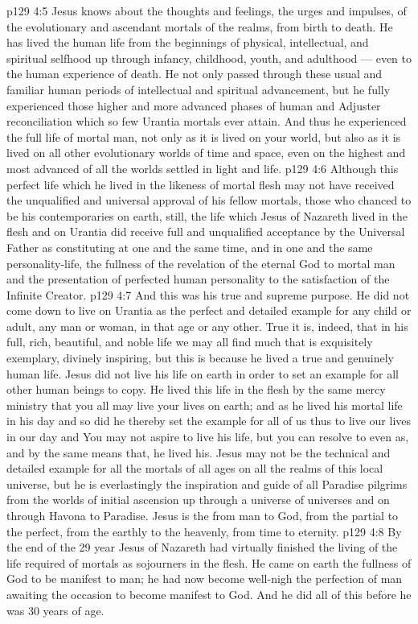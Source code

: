 \vs p129 4:5 Jesus knows about the thoughts and feelings, the urges and impulses, of the evolutionary and ascendant mortals of the realms, from birth to death. He has lived the human life from the beginnings of physical, intellectual, and spiritual selfhood up through infancy, childhood, youth, and adulthood --- even to the human experience of death. He not only passed through these usual and familiar human periods of intellectual and spiritual advancement, but he  fully experienced those higher and more advanced phases of human and Adjuster reconciliation which so few Urantia mortals ever attain. And thus he experienced the full life of mortal man, not only as it is lived on your world, but also as it is lived on all other evolutionary worlds of time and space, even on the highest and most advanced of all the worlds settled in light and life.
\vs p129 4:6 Although this perfect life which he lived in the likeness of mortal flesh may not have received the unqualified and universal approval of his fellow mortals, those who chanced to be his contemporaries on earth, still, the life which Jesus of Nazareth lived in the flesh and on Urantia did receive full and unqualified acceptance by the Universal Father as constituting at one and the same time, and in one and the same personality\hyp{}life, the fullness of the revelation of the eternal God to mortal man and the presentation of perfected human personality to the satisfaction of the Infinite Creator.
\vs p129 4:7 And this was his true and supreme purpose. He did not come down to live on Urantia as the perfect and detailed example for any child or adult, any man or woman, in that age or any other. True it is, indeed, that in his full, rich, beautiful, and noble life we may all find much that is exquisitely exemplary, divinely inspiring, but this is because he lived a true and genuinely human life. Jesus did not live his life on earth in order to set an example for all other human beings to copy. He lived this life in the flesh by the same mercy ministry that you all may live your lives on earth; and as he lived his mortal life in his day and  so did he thereby set the example for all of us thus to live our lives in our day and  You may not aspire to live his life, but you can resolve to  even as, and by the same means that, he lived his. Jesus may not be the technical and detailed example for all the mortals of all ages on all the realms of this local universe, but he is everlastingly the inspiration and guide of all Paradise pilgrims from the worlds of initial ascension up through a universe of universes and on through Havona to Paradise. Jesus is the  from man to God, from the partial to the perfect, from the earthly to the heavenly, from time to eternity.
\vs p129 4:8 \pc By the end of the 29 year Jesus of Nazareth had virtually finished the living of the life required of mortals as sojourners in the flesh. He came on earth the fullness of God to be manifest to man; he had now become well\hyp{}nigh the perfection of man awaiting the occasion to become manifest to God. And he did all of this before he was 30 years of age.
